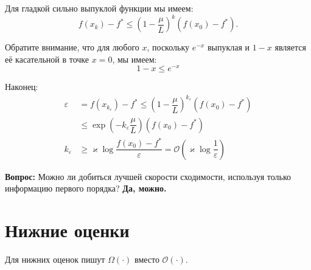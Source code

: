 \documentclass[
  russian,
  letterpaper,
  DIV=11,
  numbers=noendperiod]{scrartcl}
\begin{document}
Для гладкой сильно выпуклой функции мы имеем: \[
f(x_{k})-f^* \leq \left(1- \dfrac{\mu}{L}\right)^k (f(x_0)-f^*).
\]

Обратите внимание, что для любого \(x\), поскольку \(e^{-x}\) выпуклая и
\(1-x\) является её касательной в точке \(x=0\), мы имеем: \[
1 - x \leq e^{-x}
\]

Наконец: \[
\begin{aligned}
\varepsilon &= f(x_{k_\varepsilon})-f^* \leq  \left(1- \dfrac{\mu}{L}\right)^{k_\varepsilon} (f(x_0)-f^*) \\
&\leq \exp\left(- k_\varepsilon\dfrac{\mu}{L}\right) (f(x_0)-f^*) \\
k_\varepsilon &\geq \varkappa \log \dfrac{f(x_0)-f^*}{\varepsilon} = \mathcal{O} \left( \varkappa \log \dfrac{1}{\varepsilon}\right)
\end{aligned}
\]

\textbf{Вопрос: }Можно ли добиться лучшей скорости сходимости, используя
только информацию первого порядка? \textbf{Да, можно.}

\section{Нижние
оценки}\label{ux43dux438ux436ux43dux438ux435-ux43eux446ux435ux43dux43aux438}

Для нижних оценок пишут \(\Omega \left( \cdot \right)\) вместо
\(\mathcal{O} \left( \cdot \right)\).
\end{document}
